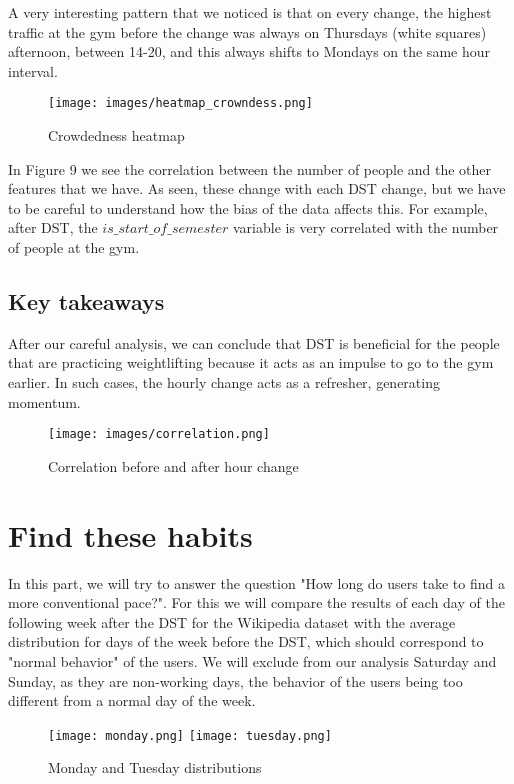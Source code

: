 \documentclass[11pt]{article}
\begin{document}
A very interesting pattern that we noticed is that on every change, the highest traffic at the gym before the change was always on Thursdays (white squares) afternoon, between 14-20, and this always shifts to Mondays on the same hour interval.

\begin{figure}[h!]
\label{sec:gym_crowdness_before_after}
\centering
\texttt{[image: images/heatmap\_crowndess.png]}
\caption{Crowdedness heatmap}
\end{figure}

In Figure 9 we see the correlation between the number of people and the other features that we have. As seen, these change with each DST change, but we have to be careful to understand how the bias of the data affects this. For example, after DST, the $is\_start\_of\_semester$ variable is very correlated with the number of people at the gym.

\subsection{Key takeaways}

After our careful analysis, we can conclude that DST is beneficial for the people
that are practicing weightlifting because it acts as an impulse to go to the gym
earlier. In such cases, the hourly change acts as a refresher, generating momentum.

\begin{figure}[h!]
\label{fig:gym_crowdness_correlation}
\centering
\texttt{[image: images/correlation.png]}
\caption{Correlation before and after hour change}
\end{figure}

\section{Find these habits}
\label{sec:habits}
In this part, we will try to answer the question "How long do users take to find a more conventional pace?". For this we will compare the results of each day of the following week after the DST for the Wikipedia dataset with the average distribution for days of the week before the DST, which should correspond to "normal behavior" of the users. We will exclude from our analysis Saturday and Sunday, as they are non-working days, the behavior of the users being too different from a normal day of the week.

\begin{figure}[h!]
\centering
\texttt{[image: monday.png]}
\texttt{[image: tuesday.png]}
\caption{Monday and Tuesday distributions}
\end{figure}
\end{document}
